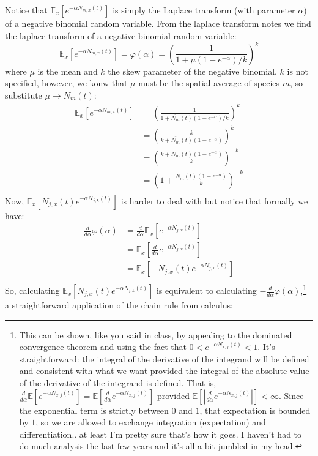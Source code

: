 \documentclass[11pt]{amsart}
\newcommand\Ex[0]{\mathbb{E}_x}
\begin{document}
Notice that $\Ex[e^{-\alpha N_{m,x}(t)}]$ is simply the Laplace transform (with parameter $\alpha$) of a negative binomial random variable.  From the laplace transform notes we find the laplace transform of a negative binomial random variable:
\[
\Ex[e^{-\alpha N_{m,x}(t)}]=\varphi(\alpha)=\left(\frac{1}{1+\mu(1-e^{-\alpha})/k}\right)^k
\]
where $\mu$ is the mean and $k$ the skew parameter of the negative binomial.  $k$ is not specified, however, we konw that $\mu$ must be the spatial average of species $m$, so substitute $\mu \to \overline{N_m}(t)$:
\begin{align*}
\Ex[e^{-\alpha N_{m,x}(t)}] &= \left(\frac{1}{1+\overline{N_m}(t)(1-e^{-\alpha})/k}\right)^k\\
&= \left(\frac{k}{k+\overline{N_m}(t)(1-e^{-\alpha})}\right)^k\\
&= \left(\frac{k+\overline{N_m}(t)(1-e^{-\alpha})}{k}\right)^{-k}\\
&= \left(1+\frac{\overline{N_m}(t)(1-e^{-\alpha})}{k}\right)^{-k}\\
\end{align*}
Now, $\Ex[N_{j,x}(t)e^{-\alpha N_{j,k}(t)}]$ is harder to deal with but notice that formally we have:
\begin{align*}
\frac{d}{d\alpha}\varphi(\alpha) &= \frac{d}{d\alpha}\Ex[e^{-\alpha N_{j,x}(t)}]\\
&=\Ex\left[\frac{d}{d\alpha}e^{-\alpha N_{j,x}(t)}\right]\\
&=\Ex\left[-N_{j,x}(t)e^{-\alpha N_{j,x}(t)}\right]\\
\end{align*}
So, calculating $\Ex[N_{j,x}(t)e^{-\alpha N_{j,k}(t)}]$ is equivalent to calculating $-\frac{d}{d\alpha}\varphi(\alpha)$,\footnote{This can be shown, like you said in class, by appealing to the dominated convergence theorem and using the fact that $0<e^{-\alpha N_{x,j}(t)}<1$. It's straightforward: the integral of the derivative of the integrand will be defined and consistent with what we want provided the integral of the absolute value of the derivative of the integrand is defined.  That is, $\frac{d}{d\alpha}\mathbb{E}[e^{-\alpha N_{x,j}(t)}] = \mathbb{E}[\frac{d}{d\alpha}e^{-\alpha N_{x,j}(t)}]$ provided $\mathbb{E}[|\frac{d}{d\alpha}e^{-\alpha N_{x,j}(t)}|]<\infty$.  Since the exponential term is strictly between $0$ and $1$, that expectation is bounded by $1$, so we are allowed to exchange integration (expectation) and differentiation.. at least I'm pretty sure that's how it goes.  I haven't had to do much analysis the last few years and it's all a bit jumbled in my head.} a straightforward application of the chain rule from calculus:
\end{document}
